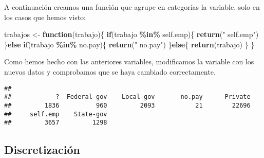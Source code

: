 \documentclass[]{article}
\newenvironment{Shaded}{\begin{snugshade}}{\end{snugshade}}
\newcommand{\ControlFlowTok}[1]{\textcolor[rgb]{0.13,0.29,0.53}{\textbf{#1}}}
\newcommand{\KeywordTok}[1]{\textcolor[rgb]{0.13,0.29,0.53}{\textbf{#1}}}
\newcommand{\NormalTok}[1]{#1}
\newcommand{\OperatorTok}[1]{\textcolor[rgb]{0.81,0.36,0.00}{\textbf{#1}}}
\newcommand{\StringTok}[1]{\textcolor[rgb]{0.31,0.60,0.02}{#1}}
\begin{document}
A continuación creamos una función que agrupe en categorías la variable,
solo en los casos que hemos visto:

\begin{Shaded}
\begin{Highlighting}[]
\NormalTok{trabajos \textless{}{-}}\StringTok{ }\ControlFlowTok{function}\NormalTok{(trabajo)\{}
  \ControlFlowTok{if}\NormalTok{(trabajo }\OperatorTok{\%in\%}\StringTok{ }\NormalTok{self.emp)\{}
    \KeywordTok{return}\NormalTok{(}\StringTok{" self.emp"}\NormalTok{)}
\NormalTok{  \}}\ControlFlowTok{else} \ControlFlowTok{if}\NormalTok{(trabajo }\OperatorTok{\%in\%}\StringTok{ }\NormalTok{no.pay)\{}
    \KeywordTok{return}\NormalTok{(}\StringTok{" no.pay"}\NormalTok{)}
\NormalTok{  \}}\ControlFlowTok{else}\NormalTok{\{}
    \KeywordTok{return}\NormalTok{(trabajo)}
\NormalTok{  \}}
\NormalTok{\}}
\end{Highlighting}
\end{Shaded}

Como hemos hecho con las anteriores variables, modificamos la variable
con los nuevos datos y comprobamos que se haya cambiado correctamente.

\begin{Shaded}
\end{Shaded}

\begin{Shaded}
\end{Shaded}

\begin{verbatim}
## 
##            ?  Federal-gov    Local-gov       no.pay      Private 
##         1836          960         2093           21        22696 
##     self.emp    State-gov 
##         3657         1298
\end{verbatim}

\hypertarget{discretizacion}{%
\subsection{Discretización}\label{discretizacion}}
\end{document}
